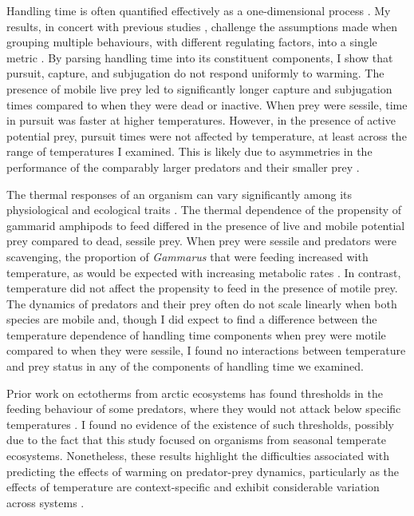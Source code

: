 Handling time is often quantified effectively as a one-dimensional process \citep{jeschke2002}. My results, in concert with previous studies \citep{jeschke2002, sentis2013}, challenge the assumptions made when grouping multiple behaviours, with different regulating factors, into a single metric \citep{enlund2011, sentis2013}. By parsing handling time into its constituent components, I show that pursuit, capture, and subjugation do not respond uniformly to warming. The presence of mobile live prey led to significantly longer capture and subjugation times compared to when they were dead or inactive. When prey were sessile, time in pursuit was faster at higher temperatures. However, in the presence of active potential prey, pursuit times were not affected by temperature, at least across the range of temperatures I examined. This is likely due to asymmetries in the performance of the comparably larger predators and their smaller prey \citep{dell2014}.  

The thermal responses of an organism can vary significantly among its physiological and ecological traits \citep{dell2011}. The thermal dependence of the propensity of gammarid amphipods to feed differed in the presence of live and mobile potential prey compared to dead, sessile prey. When prey were sessile and predators were scavenging, the proportion of \emph{Gammarus} that were feeding increased with temperature, as would be expected with increasing metabolic rates \citep{brown2004, schmidlin2015, labaude2016}.  In contrast, temperature did not affect the propensity to feed in the presence of motile prey. The dynamics of predators and their prey often do not scale linearly when both species are mobile \citep{dell2014} and, though I did expect to find a difference between the temperature dependence of handling time components when prey were motile compared to when they were sessile, I found no interactions between temperature and prey status in any of the components of handling time we examined. 

Prior work on ectotherms from arctic ecosystems has found thresholds in the feeding behaviour of some predators, where they would not attack below specific temperatures \citep{ohlund2015}. I found no evidence of the existence of such thresholds, possibly due to the fact that this study focused on organisms from seasonal temperate ecosystems. Nonetheless, these results highlight the difficulties associated with predicting the effects of warming on predator-prey dynamics, particularly as the effects of temperature are context-specific and exhibit considerable variation across systems \citep{enlund2011, ohlund2015}. 

